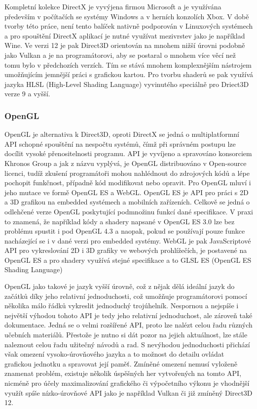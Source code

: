 Kompletní kolekce DirectX je vyvýjena firmou Microsoft a je využívána především v počítačích se systémy Windows a v herních konzolích Xbox. V době tvorby této práce, není tento balíček nativně podporován v Linuxových systémech a pro spouštění DirectX aplikací je nutné využívat mezivrstev jako je například Wine. Ve verzi 12 je pak Direct3D orientován na mnohem nižší úrovni podobně jako Vulkan a je na programátorovi, aby se postaral o mnohem více věcí než tomu bylo v předchozích verzích. Tím se stává mnohem komplexnějším nástrojem umožňujícím jemnější práci s grafickou kartou. Pro tvorbu shaderů se pak využívá jazyka HLSL (High-Level Shading Language) vyvinutého speciálně pro Driect3D verze 9 a vyšší.
\subsubsection{OpenGL}
OpenGL je alternativa k Direct3D, oproti DirectX se jedná o multiplatformní API schopné spouštění na nespočtu systémů, čímž při správném postupu lze docílit vysoké přenositelnosti programu. API je vyvíjeno a spravováno konsorciem Khronos Group a jak z názvu vyplývá, je OpenGL distribuováno v Open-source licenci, tudíž zkušení programátoři mohou nahlédnout do zdrojových kódů a lépe pochopit funkčnost, případně kód modifikovat nebo opravit. Pro OpenGL mluví i jeho mutace ve formě OpenGL ES a WebGL. OpenGL ES je API pro práci s 2D a 3D grafikou na embedded systémech a mobilních zařízeních. Celkově se jedná o odlehčené verze OpenGL poskytující podmnožinu funkcí dané specifikace. V praxi to znamená, že například kódy a shadery napsané v OpenGL ES 3.0 lze bez problému spustit i pod OpenGL 4.3 a naopak, pokud se používají pouze funkce nacházející se i v dané verzi pro embedded systémy. WebGL je pak JavaScriptové API pro vykreslování 2D i 3D grafiky ve webových prohlížečích, je postavené na OpenGL ES a pro shadery využívá stejné specifikace a to GLSL ES (OpenGL ES Shading Language)

OpenGL jako takové je jazyk vyšší úrovně, což z nějak dělá ideální jazyk do začátků díky jeho relativní jednoduchosti, což umožňuje programátorovi pomocí několika málo řádků vykreslit jednoduchý trojúhelník. Nespornou a nejspíše i největší výhodou tohoto API je tedy jeho relativní jednoduchost, ale zároveň také dokumentace. Jedná se o velmi rozšířené API, proto lze nalézt celou řadu různých učebních materiálů. Přestože je nutno si dát pozor na jejich aktuálnost, lze stále naleznout celou řadu užitečný návodů a rad. S nevýhodou jednoduchosti přichází však omezení vysoko-úrovňového jazyka a to možnost do detailu ovládat grafickou jednotku a spravovat její paměť. Zmíněné omezení nemusí vyloženě znamenat problém, existuje několik úspěšných her vytvořených na tomto API, nicméně pro účely maximalizování grafického či výpočetního výkonu je vhodnější využít spíše nízko-úrovňové API jako je například Vulkan či již zmíněný Direct3D 12.


